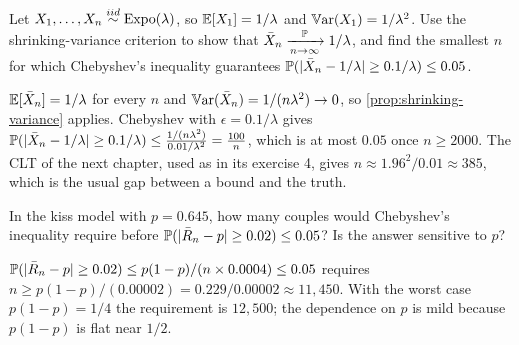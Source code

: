 \begin{exercise}
Let $X_1, \ldots, X_n \stackrel{iid}{\sim} \text{Expo}(\lambda)$, so $\operatorname*{\mathbb{E}}[X_1] = 1/\lambda$ and $\operatorname*{\mathbb{V}\text{ar}}(X_1) = 1/\lambda^2$. Use the shrinking-variance criterion to show that $\bar{X}_n \xrightarrow [n \to \infty ]{\mathbb{P}} 1/\lambda$, and find the smallest $n$ for which Chebyshev's inequality guarantees $\mathbb{P}(\lvert\bar{X}_n - 1/\lambda\rvert \geq 0.1/\lambda) \leq 0.05$.
\end{exercise}
\begin{solution}
$\operatorname*{\mathbb{E}}[\bar{X}_n] = 1/\lambda$ for every $n$ and $\operatorname*{\mathbb{V}\text{ar}}(\bar{X}_n) = 1/(n\lambda^2) \to 0$, so \cref{prop:shrinking-variance} applies. Chebyshev with $\epsilon = 0.1/\lambda$ gives $\mathbb{P}(\lvert\bar{X}_n - 1/\lambda\rvert \geq 0.1/\lambda) \leq \frac{1/(n\lambda^2)}{0.01/\lambda^2} = \frac{100}{n}$, which is at most $0.05$ once $n \geq 2000$. The CLT of the next chapter, used as in its exercise 4, gives $n \approx 1.96^2/0.01 \approx 385$, which is the usual gap between a bound and the truth.
\end{solution}

\begin{exercise}
In the kiss model with $p = 0.645$, how many couples would Chebyshev's inequality require before $\mathbb{P}(\lvert\bar{R}_n - p\rvert \geq 0.02) \leq 0.05$? Is the answer sensitive to $p$?
\end{exercise}
\begin{solution}
$\mathbb{P}(\lvert\bar{R}_n - p\rvert \geq 0.02) \leq p(1-p)/(n \times 0.0004) \leq 0.05$ requires $n \geq p(1-p)/(0.00002) = 0.229/0.00002 \approx 11{,}450$. With the worst case $p(1-p) = 1/4$ the requirement is $12{,}500$; the dependence on $p$ is mild because $p(1-p)$ is flat near $1/2$.
\end{solution}
